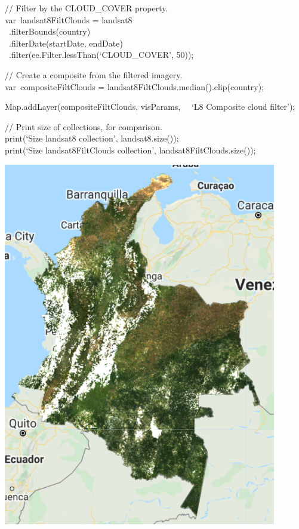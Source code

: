 \documentclass[
  letterpaper,
  DIV=11,
  numbers=noendperiod]{scrreprt}
\begin{document}
// Filter by the CLOUD\_COVER property.\\
var~landsat8FiltClouds = landsat8\\
\hspace*{0.333em} ~.filterBounds(country)\\
\hspace*{0.333em} ~.filterDate(startDate, endDate)\\
\hspace*{0.333em} ~.filter(ee.Filter.lessThan(`CLOUD\_COVER', 50));

// Create a composite from the filtered imagery.\\
var~compositeFiltClouds = landsat8FiltClouds.median().clip(country);

Map.addLayer(compositeFiltClouds, visParams,~ ~`L8 Composite cloud
filter');

// Print size of collections, for comparison.\\
print(`Size landsat8 collection', landsat8.size());\\
print(`Size landsat8FiltClouds collection', landsat8FiltClouds.size());

\includegraphics{./F4/image50.png}
\end{document}
